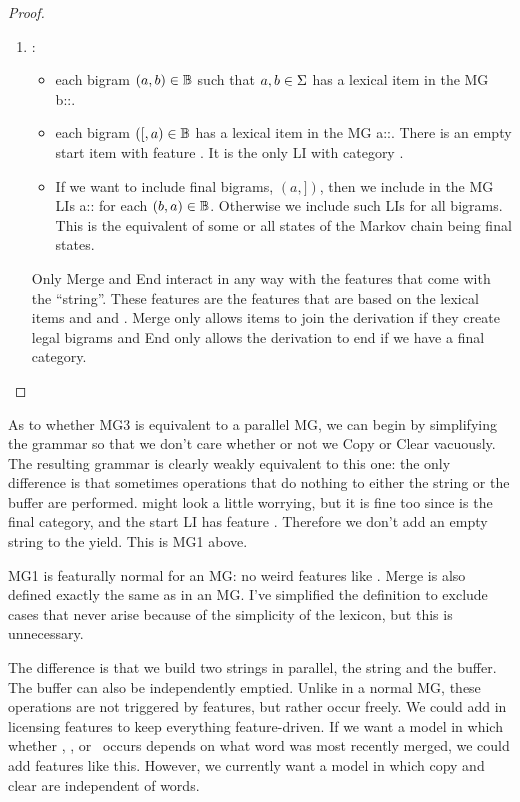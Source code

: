 \documentclass[12pt]{article}
\theoremstyle{definition}
\begin{document}
\begin{proof}[Proof]
\begin{enumerate}
\begin{tabular}[H]{p{} | p{}}
    \end{tabular}
    
  \item \BIGR: 
    \begin{itemize}
    \item each bigram $(a,b)\in\mathbb{B}$ such that $a,b\in\Sigma$ has a
      lexical item in the MG b::.
    \item each bigram $({[},a)\in\mathbb{B}$ has a lexical item in the MG a::. There is an empty start item with feature . It is the only LI with category .
    \item If we want to include final bigrams, $(a,{]})$, then we include in the MG LIs a:: for each $(b,a)\in\mathbb{B}$. Otherwise we include such LIs for all bigrams. This is the equivalent of some or all states of the Markov chain being final states.
    \end{itemize}
Only Merge and End interact in any way with the features that come with the ``string''. These features are the features that are based on the lexical items and  and . Merge only allows items to join the derivation if they create legal bigrams and End only allows the derivation to end if we have a final category.

  \end{enumerate}
\end{proof}

As to whether MG3 is equivalent to a parallel MG, we can begin by simplifying the grammar so that we don't care whether or not we Copy or Clear vacuously. The resulting grammar is clearly weakly equivalent to this one: the only difference is that sometimes operations that do nothing to either the string or the buffer are performed. \ed might look a little worrying, but it is fine too since  is the final category, and the start LI has feature . Therefore we don't add an empty string to the yield. This is MG1 above. 

MG1 is featurally normal for an MG: no weird features like . Merge is also defined exactly the same as in an MG. I've simplified the definition to exclude cases that never arise because of the simplicity of the lexicon, but this is unnecessary. 

The difference is that we build two strings in parallel, the string and the buffer. The buffer can also be independently emptied. Unlike in a normal MG, these operations are not triggered by features, but rather occur freely. We could add in licensing features to keep everything feature-driven. If we want a model in which whether \mg, \cp, or \cl~occurs depends on what word was most recently merged, we could add features like this. However, we currently want a model in which copy and clear are independent of words.
\end{document}
